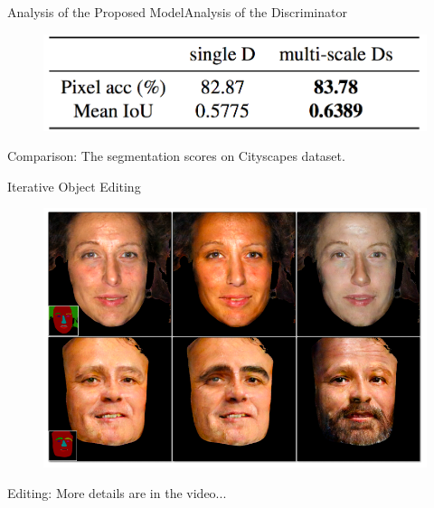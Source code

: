 \documentclass{beamer}
\begin{document}
\begin{frame}{Analysis of the  Proposed Model}{Analysis of the Discriminator}
\begin{figure}
	\centering
	\includegraphics[height=0.3\textheight]{images/table_4}
\end{figure}
%
%
\begin{beamerboxesrounded}[upper=uppercol,lower=lowercol,shadow=false]{Comparison: }
The segmentation scores on Cityscapes dataset.
\end{beamerboxesrounded}
\end{frame}

\begin{frame}{Iterative Object Editing}
\begin{figure}
	\centering
	\includegraphics[height=0.6\textheight]{images/result_4}
\end{figure}
%
%
\begin{beamerboxesrounded}[upper=uppercol,lower=lowercol,shadow=false]{Editing: }
More details are in the video...
\end{beamerboxesrounded}
\end{frame}
\end{document}
